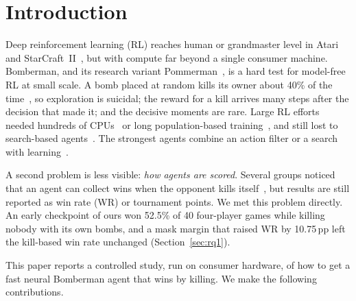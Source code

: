 \documentclass[conference]{IEEEtran}
\newcommand{\pp}{\,pp}
\begin{document}
\section{Introduction}

Deep reinforcement learning (RL) reaches human or grandmaster level in Atari and StarCraft~II~\cite{mnih2015dqn,vinyals2019alphastar}, but with compute far beyond a single consumer machine. Bomberman, and its research variant Pommerman~\cite{resnick2018pommerman}, is a hard test for model-free RL at small scale. A bomb placed at random kills its owner about 40\% of the time~\cite{gao2019hard}, so exploration is suicidal; the reward for a kill arrives many steps after the decision that made it; and the decisive moments are rare. Large RL efforts needed hundreds of CPUs~\cite{peng2018continual} or long population-based training~\cite{huynh2024}, and still lost to search-based agents~\cite{osogami2019,huynh2024}. The strongest agents combine an action filter or a search with learning~\cite{gao2019skynet,osogami2019,weil2023}.

A second problem is less visible: \emph{how agents are scored}. Several groups noticed that an agent can collect wins when the opponent kills itself~\cite{gao2019skynet,kartal2018demonstrator,huynh2024,weil2023}, but results are still reported as win rate (WR) or tournament points. We met this problem directly. An early checkpoint of ours won 52.5\% of 40 four-player games while killing nobody with its own bombs, and a mask margin that raised WR by 10.75\pp{} left the kill-based win rate unchanged (Section~\ref{sec:rq1}).

This paper reports a controlled study, run on consumer hardware, of how to get a fast neural Bomberman agent that wins by killing. We make the following contributions.
\end{document}
